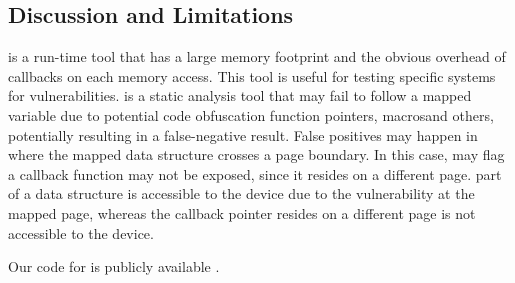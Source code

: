 \subsection{Discussion and Limitations}
\dkasan is a run-time tool that has a large memory footprint and the obvious overhead of callbacks on each memory access. This tool is useful for testing specific systems for vulnerabilities.
\tool is a static analysis tool that may fail to follow a mapped variable due to potential code obfuscation \DIFdelbegin {}\DIFdelend \DIFaddbegin {}\DIFaddend function pointers, macros\DIFaddbegin \DIFadd{, }\DIFaddend and others, potentially resulting in a false-negative result. False positives may happen in \DIFdelbegin {}\DIFdelend \DIFaddbegin {}\DIFaddend %
where the mapped data structure crosses a  page boundary. In this case, \tool may flag a callback function \DIFdelbegin {}\DIFdelend \DIFaddbegin {}\DIFaddend may not be exposed, since it resides on a different page. \DIFdelbegin {}\DIFdelend \DIFaddbegin {}\DIFaddend part of a data structure is accessible to the device due to the \subpage{} vulnerability at the mapped page, whereas the callback pointer resides on a different page \DIFdelbegin {}\DIFdelend \DIFaddbegin {}\DIFaddend is not accessible to the device.%

Our code for \dkasan is publicly available \cite{DKASAN}.